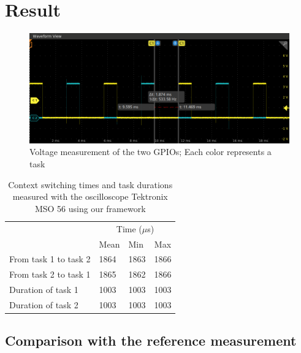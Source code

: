 \section{Result}

\begin{figure}[!ht]
  \centering
  \includegraphics[scale=0.5]{assets/framework-value-wave.png}
  \caption{\label{fig:framework-value-wave}Voltage measurement of the two GPIOs; Each color represents a task}
\end{figure}

\begin{table}[!ht]
  \centering
  \begin{tabular}{llll}
                        & \multicolumn{3}{c}{Time ($\mu$s)}                             \\ \cline{2-4} 
                        & \multicolumn{1}{c}{Mean} & Min  & \multicolumn{1}{c}{Max} \\ \cline{2-4} 
  From task 1 to task 2 & 1864                     & 1863 & 1866                    \\
  From task 2 to task 1 & 1865                     & 1862 & 1866                    \\
  Duration of task 1    & 1003                     & 1003 & 1003                    \\
  Duration of task 2    & 1003                     & 1003 & 1003                   
  \end{tabular}
  \caption{Context switching times and task durations measured with the oscilloscope Tektronix MSO 56 using our framework}
  \label{tab:framework-measurement}
\end{table}

\subsection{Comparison with the reference measurement}

